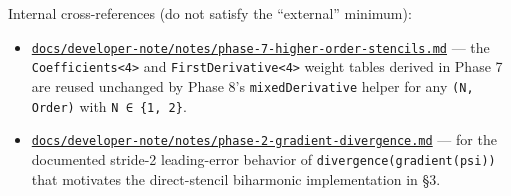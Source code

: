Internal cross-references (do not satisfy the ``external'' minimum):

\begin{itemize}
\tightlist
\item
  \href{phase-7-higher-order-stencils.md}{\passthrough{\lstinline!docs/developer-note/notes/phase-7-higher-order-stencils.md!}}
  --- the \passthrough{\lstinline!Coefficients<4>!} and
  \passthrough{\lstinline!FirstDerivative<4>!} weight tables derived in
  Phase 7 are reused unchanged by Phase 8's
  \passthrough{\lstinline!mixedDerivative!} helper for any
  \passthrough{\lstinline!(N, Order)!} with
  \passthrough{\lstinline!N ∈ \{1, 2\}!}.
\item
  \href{phase-2-gradient-divergence.md}{\passthrough{\lstinline!docs/developer-note/notes/phase-2-gradient-divergence.md!}}
  --- for the documented stride-2 leading-error behavior of
  \passthrough{\lstinline!divergence(gradient(psi))!} that motivates the
  direct-stencil biharmonic implementation in §3.
\end{itemize}

